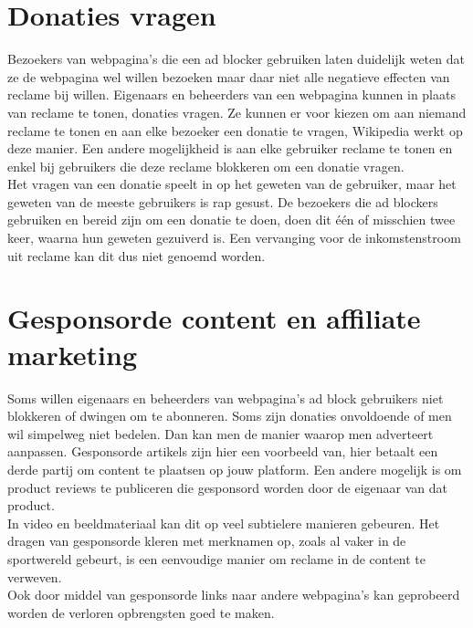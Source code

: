 \documentclass[pdftex,a4paper,12pt,twoside]{report}
\begin{document}
\section{Donaties vragen}
\label{sec Donaties vragen}
Bezoekers van webpagina's die een ad blocker gebruiken laten duidelijk weten dat ze de webpagina wel willen bezoeken maar daar niet alle negatieve effecten van reclame bij willen. Eigenaars en beheerders van een webpagina kunnen in plaats van reclame te tonen, donaties vragen. Ze kunnen er voor kiezen om aan niemand reclame te tonen en aan elke bezoeker een donatie te vragen, Wikipedia werkt op deze manier. Een andere mogelijkheid is aan elke gebruiker reclame te tonen en enkel bij gebruikers die deze reclame blokkeren om een donatie vragen.
\\
Het vragen van een donatie speelt in op het geweten van de gebruiker, maar het geweten van de meeste gebruikers is rap gesust. De bezoekers die ad blockers gebruiken en bereid zijn om een donatie te doen, doen dit één of misschien twee keer, waarna hun geweten gezuiverd is. Een vervanging voor de inkomstenstroom uit reclame kan dit dus niet genoemd worden.


\section{Gesponsorde content en affiliate marketing}
\label{sec Gesponsorde content en affiliate marketing}
Soms willen eigenaars en beheerders van webpagina's ad block gebruikers niet blokkeren of dwingen om te abonneren. Soms zijn donaties onvoldoende of men wil simpelweg niet bedelen. Dan kan men de manier waarop men adverteert aanpassen. Gesponsorde artikels zijn hier een voorbeeld van, hier betaalt een derde partij om content te plaatsen op jouw platform. Een andere mogelijk is om product reviews te publiceren die gesponsord worden door de eigenaar van dat product. 
\\
In video en beeldmateriaal kan dit op veel subtielere manieren gebeuren. Het dragen van gesponsorde kleren met merknamen op, zoals al vaker in de sportwereld gebeurt, is een eenvoudige manier om reclame in de content te verweven.
\\
Ook door middel van gesponsorde links naar andere webpagina's kan geprobeerd worden de verloren opbrengsten goed te maken.
\end{document}
